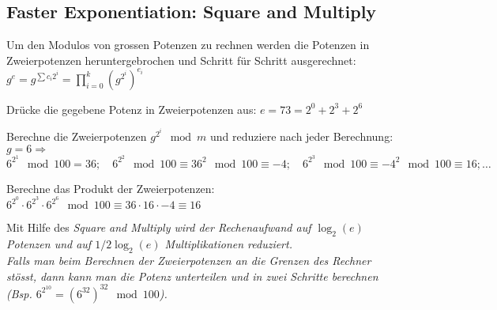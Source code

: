 \subsection{Faster Exponentiation: Square and Multiply}
Um den Modulos von grossen Potenzen zu rechnen werden die Potenzen in Zweierpotenzen heruntergebrochen und Schritt für Schritt ausgerechnet:\\
$g^e=g^{\sum c_i 2^i}=\prod_{i=0}^k \left(g^{2^i}\right)^{e_i}$
\begin{aufzaehlung}
\item Drücke die gegebene Potenz in Zweierpotenzen aus: $e=73=2^0+2^3+2^6$
\item Berechne die Zweierpotenzen $g^{2^i} \mod m$ und reduziere nach jeder Berechnung: $g=6\Rightarrow$\\ 
$6^{2^1} \mod 100 = 36;\quad 6^{2^2} \mod 100 \equiv 36^2  \mod 100 \equiv -4;\quad  6^{2^3} \mod 100 \equiv {-4}^2 \mod 100 \equiv 16; \ldots$
\item Berechne das Produkt der Zweierpotenzen: $6^{2^0}\cdot6^{2^3}\cdot6^{2^6}\mod 100\equiv 36 \cdot 16 \cdot -4 \equiv 16$
\end{aufzaehlung}
Mit Hilfe des \em Square and Multiply \em wird der Rechenaufwand auf $\log_2(e)$ Potenzen und auf $1/2 \log_2(e)$ Multiplikationen reduziert. \\
Falls man beim Berechnen der Zweierpotenzen an die Grenzen des Rechner stösst, dann kann man die Potenz unterteilen und in zwei Schritte berechnen 
(Bsp. $6^{2^{10}}=(6^{32})^{32} \mod 100$).

